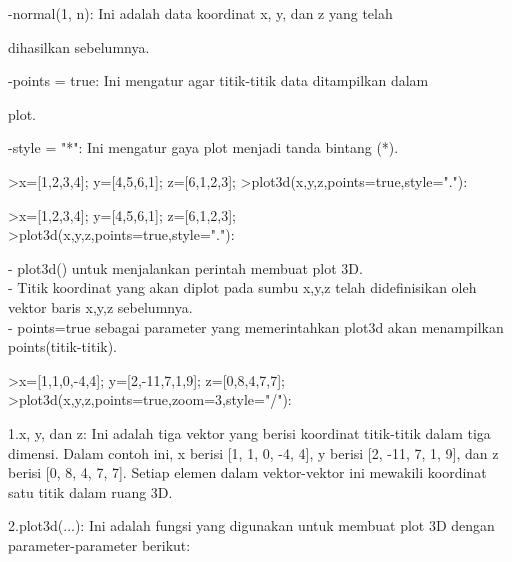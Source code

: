 \documentclass[a4paper,10pt]{article}
\begin{document}
\begin{eulernotebook}
\begin{eulercomment}
\begin{eulercomment}
\begin{eulercomment}
\begin{eulercomment}
\begin{eulercomment}
\begin{eulercomment}
\begin{eulercomment}
\begin{eulercomment}
\begin{eulercomment}
\end{eulercomment}
\begin{eulerttcomment}
 -normal(1, n): Ini adalah data koordinat x, y, dan z yang telah
\end{eulerttcomment}
\begin{eulercomment}
dihasilkan sebelumnya.\\
\end{eulercomment}
\begin{eulerttcomment}
 -points = true: Ini mengatur agar titik-titik data ditampilkan dalam
\end{eulerttcomment}
\begin{eulercomment}
plot.\\
\end{eulercomment}
\begin{eulerttcomment}
 -style = "*": Ini mengatur gaya plot menjadi tanda bintang (*).
\end{eulerttcomment}
\begin{eulerprompt}
>x=[1,2,3,4]; y=[4,5,6,1]; z=[6,1,2,3];
>plot3d(x,y,z,points=true,style="."):
\end{eulerprompt}
\begin{eulercomment}
\textgreater{}x=[1,2,3,4]; y=[4,5,6,1]; z=[6,1,2,3];\\
\textgreater{}plot3d(x,y,z,points=true,style="."):

- plot3d() untuk menjalankan perintah membuat plot 3D.\\
- Titik koordinat yang akan diplot pada sumbu x,y,z telah
didefinisikan oleh vektor baris x,y,z sebelumnya.\\
- points=true sebagai parameter yang memerintahkan plot3d akan
menampilkan points(titik-titik).

\end{eulercomment}
\begin{eulerprompt}
>x=[1,1,0,-4,4]; y=[2,-11,7,1,9]; z=[0,8,4,7,7];
>plot3d(x,y,z,points=true,zoom=3,style="/"):
\end{eulerprompt}
\begin{eulercomment}
1.x, y, dan z: Ini adalah tiga vektor yang berisi koordinat
titik-titik dalam tiga dimensi. Dalam contoh ini, x berisi [1, 1, 0,
-4, 4], y berisi [2, -11, 7, 1, 9], dan z berisi [0, 8, 4, 7, 7].
Setiap elemen dalam vektor-vektor ini mewakili koordinat satu titik
dalam ruang 3D.

2.plot3d(...): Ini adalah fungsi yang digunakan untuk membuat plot 3D
dengan parameter-parameter berikut:


\end{eulercomment}
\end{eulercomment}
\end{eulercomment}
\end{eulercomment}
\end{eulercomment}
\end{eulercomment}
\end{eulercomment}
\end{eulercomment}
\end{eulercomment}
\end{eulernotebook}
\end{document}
